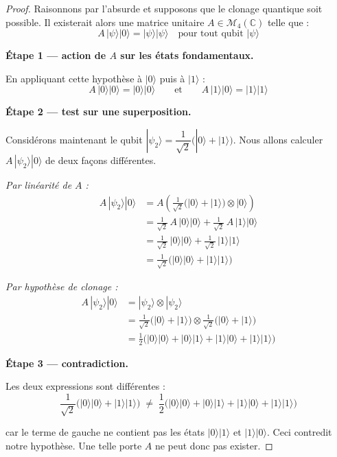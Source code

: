 \documentclass[a4paper,12pt]{article}
\begin{document}
\begin{proof}
Raisonnons par l'absurde et supposons que le clonage quantique soit possible.
Il existerait alors une matrice unitaire $A \in \mathcal{M}_4(\mathbb{C})$ telle que :
\[
A\,|\psi\rangle|0\rangle = |\psi\rangle|\psi\rangle \quad \text{pour tout qubit } |\psi\rangle
\]

\textbf{Étape 1 — action de $A$ sur les états fondamentaux.}

En appliquant cette hypothèse à $|0\rangle$ puis à $|1\rangle$ :
\[
A\,|0\rangle|0\rangle = |0\rangle|0\rangle
\qquad \text{et} \qquad
A\,|1\rangle|0\rangle = |1\rangle|1\rangle
\]

\textbf{Étape 2 — test sur une superposition.}

Considérons maintenant le qubit $|\psi_2\rangle = \dfrac{1}{\sqrt{2}}\bigl(|0\rangle + |1\rangle\bigr)$.
Nous allons calculer $A\,|\psi_2\rangle|0\rangle$ de deux façons différentes.

\medskip
\textit{Par linéarité de $A$ :}
\begin{align*}
A\,|\psi_2\rangle|0\rangle 
&= A\left(\frac{1}{\sqrt{2}}\bigl(|0\rangle + |1\rangle\bigr)\otimes|0\rangle\right) \\
&= \frac{1}{\sqrt{2}}\,A\,|0\rangle|0\rangle + \frac{1}{\sqrt{2}}\,A\,|1\rangle|0\rangle \\
&= \frac{1}{\sqrt{2}}\,|0\rangle|0\rangle + \frac{1}{\sqrt{2}}\,|1\rangle|1\rangle \\
&= \frac{1}{\sqrt{2}}\bigl(|0\rangle|0\rangle + |1\rangle|1\rangle\bigr)
\end{align*}

\textit{Par hypothèse de clonage :}
\begin{align*}
A\,|\psi_2\rangle|0\rangle 
&= |\psi_2\rangle \otimes |\psi_2\rangle \\
&= \frac{1}{\sqrt{2}}\bigl(|0\rangle+|1\rangle\bigr) \otimes \frac{1}{\sqrt{2}}\bigl(|0\rangle+|1\rangle\bigr) \\
&= \frac{1}{2}\bigl(|0\rangle|0\rangle + |0\rangle|1\rangle + |1\rangle|0\rangle + |1\rangle|1\rangle\bigr)
\end{align*}

\textbf{Étape 3 — contradiction.}

Les deux expressions sont différentes :
\[
\frac{1}{\sqrt{2}}\bigl(|0\rangle|0\rangle + |1\rangle|1\rangle\bigr)
\;\neq\;
\frac{1}{2}\bigl(|0\rangle|0\rangle + |0\rangle|1\rangle + |1\rangle|0\rangle + |1\rangle|1\rangle\bigr)
\]

car le terme de gauche ne contient pas les états $|0\rangle|1\rangle$ et $|1\rangle|0\rangle$.
Ceci contredit notre hypothèse. Une telle porte $A$ ne peut donc pas exister.
\end{proof}
\end{document}
